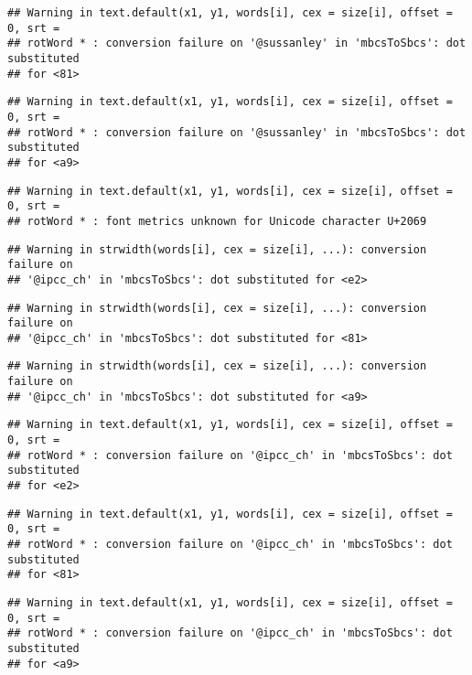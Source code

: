 \documentclass[
]{article}
\begin{document}
\begin{verbatim}
## Warning in text.default(x1, y1, words[i], cex = size[i], offset = 0, srt =
## rotWord * : conversion failure on '@sussanley⁩' in 'mbcsToSbcs': dot substituted
## for <81>
\end{verbatim}

\begin{verbatim}
## Warning in text.default(x1, y1, words[i], cex = size[i], offset = 0, srt =
## rotWord * : conversion failure on '@sussanley⁩' in 'mbcsToSbcs': dot substituted
## for <a9>
\end{verbatim}

\begin{verbatim}
## Warning in text.default(x1, y1, words[i], cex = size[i], offset = 0, srt =
## rotWord * : font metrics unknown for Unicode character U+2069
\end{verbatim}

\begin{verbatim}
## Warning in strwidth(words[i], cex = size[i], ...): conversion failure on
## '@ipcc_ch⁩' in 'mbcsToSbcs': dot substituted for <e2>
\end{verbatim}

\begin{verbatim}
## Warning in strwidth(words[i], cex = size[i], ...): conversion failure on
## '@ipcc_ch⁩' in 'mbcsToSbcs': dot substituted for <81>
\end{verbatim}

\begin{verbatim}
## Warning in strwidth(words[i], cex = size[i], ...): conversion failure on
## '@ipcc_ch⁩' in 'mbcsToSbcs': dot substituted for <a9>
\end{verbatim}

\begin{verbatim}
## Warning in text.default(x1, y1, words[i], cex = size[i], offset = 0, srt =
## rotWord * : conversion failure on '@ipcc_ch⁩' in 'mbcsToSbcs': dot substituted
## for <e2>
\end{verbatim}

\begin{verbatim}
## Warning in text.default(x1, y1, words[i], cex = size[i], offset = 0, srt =
## rotWord * : conversion failure on '@ipcc_ch⁩' in 'mbcsToSbcs': dot substituted
## for <81>
\end{verbatim}

\begin{verbatim}
## Warning in text.default(x1, y1, words[i], cex = size[i], offset = 0, srt =
## rotWord * : conversion failure on '@ipcc_ch⁩' in 'mbcsToSbcs': dot substituted
## for <a9>
\end{verbatim}
\end{document}
